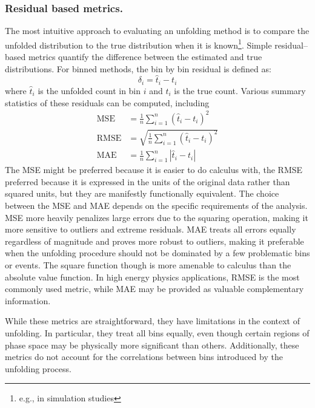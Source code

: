         \subsubsection{Residual based metrics.}
            The most intuitive approach to evaluating an unfolding method is to compare the unfolded distribution to the true distribution when it is known\footnote{e.g., in simulation studies}.
            Simple residual--based metrics quantify the difference between the estimated and true distributions.
            For binned methods, the bin by bin residual is defined as:
            \begin{equation}
                \delta_i = \hat{t}_i - t_i
            \end{equation}
            where \(\hat{t}_i\) is the unfolded count in bin \(i\) and \(t_i\) is the true count.
            Various summary statistics of these residuals can be computed, including
            \begin{align}
                \text{MSE} &= \frac{1}{n}\sum_{i=1}^{n}(\hat{t}_i - t_i)^2\\
                \text{RMSE} &= \sqrt{\frac{1}{n}\sum_{i=1}^{n}(\hat{t}_i - t_i)^2}\\
                \text{MAE} &= \frac{1}{n}\sum_{i=1}^{n}|\hat{t}_i - t_i|
            \end{align}
            The MSE might be preferred because it is easier to do calculus with, the RMSE preferred because it is expressed in the units of the original data rather than squared units, but they are manifestly functionally equivalent.
            The choice between the MSE and MAE depends on the specific requirements of the analysis.
            MSE more heavily penalizes large errors due to the squaring operation, making it more sensitive to outliers and extreme residuals.
            MAE treats all errors equally regardless of magnitude and proves more robust to outliers, making it preferable when the unfolding procedure should not be dominated by a few problematic bins or events.
            The square function though is more amenable to calculus than the absolute value function.
            In high energy physics applications, RMSE is the most commonly used metric, while MAE may be provided as valuable complementary information.
            
            While these metrics are straightforward, they have limitations in the context of unfolding.
            In particular, they treat all bins equally, even though certain regions of phase space may be physically more significant than others.
            Additionally, these metrics do not account for the correlations between bins introduced by the unfolding process.
            
